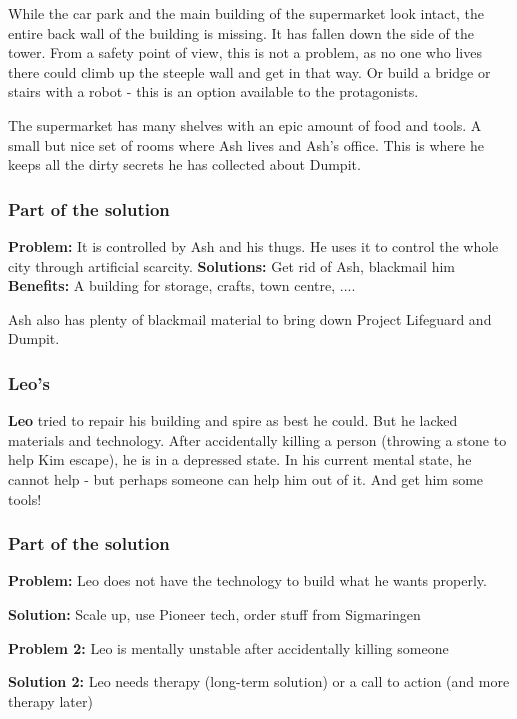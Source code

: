 While the car park and the main building of the supermarket look intact, the entire back wall of the building is missing. It has fallen down the side of the tower. From a safety point of view, this is not a problem, as no one who lives there could climb up the steeple wall and get in that way. Or build a bridge or stairs with a robot - this is an option available to the protagonists.

The supermarket has many shelves with an epic amount of food and tools. A small but nice set of rooms where Ash lives and Ash's office. This is where he keeps all the dirty secrets he has collected about Dumpit.

\subsubsection{Part of the solution}

\textbf{Problem:} It is controlled by Ash and his thugs. He uses it to control the whole city through artificial scarcity.
\textbf{Solutions:} Get rid of Ash, blackmail him
\textbf{Benefits:} A building for storage, crafts, town centre, ....

Ash also has plenty of blackmail material to bring down Project Lifeguard and Dumpit.

\subsubsection{Leo's}

\textbf{Leo} tried to repair his building and spire as best he could. But he lacked materials and technology. After accidentally killing a person (throwing a stone to help Kim escape), he is in a depressed state. In his current mental state, he cannot help - but perhaps someone can help him out of it. And get him some tools!

\subsubsection{Part of the solution}

\textbf{Problem:} Leo does not have the technology to build what he wants properly.

\textbf{Solution:} Scale up, use Pioneer tech, order stuff from Sigmaringen

\textbf{Problem 2:} Leo is mentally unstable after accidentally killing someone

\textbf{Solution 2:} Leo needs therapy (long-term solution) or a call to action (and more therapy later)

